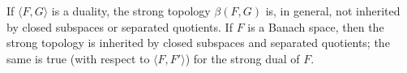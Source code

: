 If $\langle F, G \rangle$ is a duality, the strong topology $\beta(F, G)$ is, in general, not inherited by closed subspaces or separated quotients. If $F$ is a Banach space, then the strong topology is inherited by closed subspaces and separated quotients; the same is true (with respect to $\langle F, F' \rangle$) for the strong dual of $F$.
